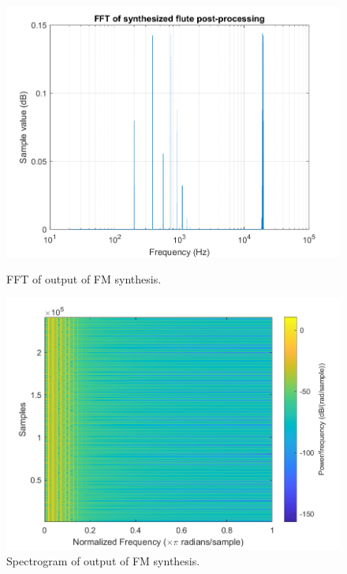 \documentclass{article}
\begin{document}
            \begin{figure}[H]
                \centering
                \begin{minipage}{.49\textwidth}
                    \includegraphics[width=\linewidth]{images/synthFluteFFT.png}%
                    \centering
                    \caption{FFT of output of FM synthesis.}
                    \label{synthFluteFFT}
                \end{minipage}
                \begin{minipage}{.49\textwidth}
                    \includegraphics[width=\linewidth]{images/synthFluteSpec.png}%
                    \centering
                    \caption{Spectrogram of output of FM synthesis.}
                    \label{synthFluteSpec}
                \end{minipage}
            \end{figure}
\end{document}
